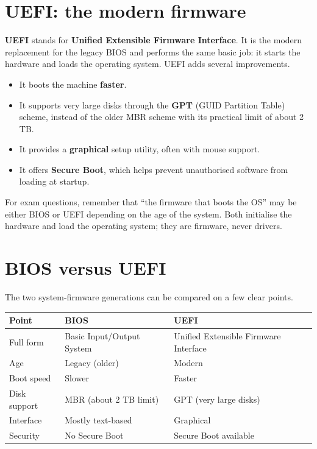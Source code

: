 \documentclass[11pt]{article}
\begin{document}
\section{UEFI: the modern firmware}
\textbf{UEFI} stands for \textbf{Unified Extensible Firmware Interface}. It
is the modern replacement for the legacy BIOS and performs the same basic
job: it starts the hardware and loads the operating system. UEFI adds
several improvements.

\begin{itemize}
  \item It boots the machine \textbf{faster}.
  \item It supports very large disks through the \textbf{GPT} (GUID
    Partition Table) scheme, instead of the older MBR scheme with its
    practical limit of about 2 TB.
  \item It provides a \textbf{graphical} setup utility, often with mouse
    support.
  \item It offers \textbf{Secure Boot}, which helps prevent unauthorised
    software from loading at startup.
\end{itemize}

For exam questions, remember that ``the firmware that boots the OS'' may be
either BIOS or UEFI depending on the age of the system. Both initialise the
hardware and load the operating system; they are firmware, never drivers.

\section{BIOS versus UEFI}
The two system-firmware generations can be compared on a few clear points.

\begin{center}
\begin{tabular}{p{}p{}p{}}
\toprule
\textbf{Point} & \textbf{BIOS} & \textbf{UEFI} \\
\midrule
Full form & Basic Input/Output System & Unified Extensible Firmware Interface \\
Age & Legacy (older) & Modern \\
Boot speed & Slower & Faster \\
Disk support & MBR (about 2 TB limit) & GPT (very large disks) \\
Interface & Mostly text-based & Graphical \\
Security & No Secure Boot & Secure Boot available \\
\bottomrule
\end{tabular}
\end{center}
\end{document}
